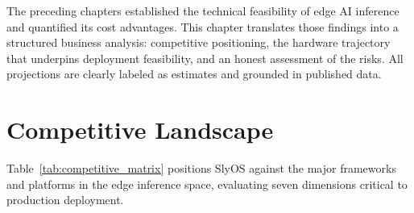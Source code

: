 \documentclass[12pt, letterpaper, twoside]{report}
\begin{document}

\noindent The preceding chapters established the technical feasibility of edge AI inference and quantified its cost advantages. This chapter translates those findings into a structured business analysis: competitive positioning, the hardware trajectory that underpins deployment feasibility, and an honest assessment of the risks. All projections are clearly labeled as estimates and grounded in published data.

\vspace{-0.5ex}
\section{Competitive Landscape}
\label{sec:competitive_landscape}
\vspace{-0.3ex}
Table~\ref{tab:competitive_matrix} positions SlyOS against the major frameworks and platforms in the edge inference space, evaluating seven dimensions critical to production deployment.
\end{document}
